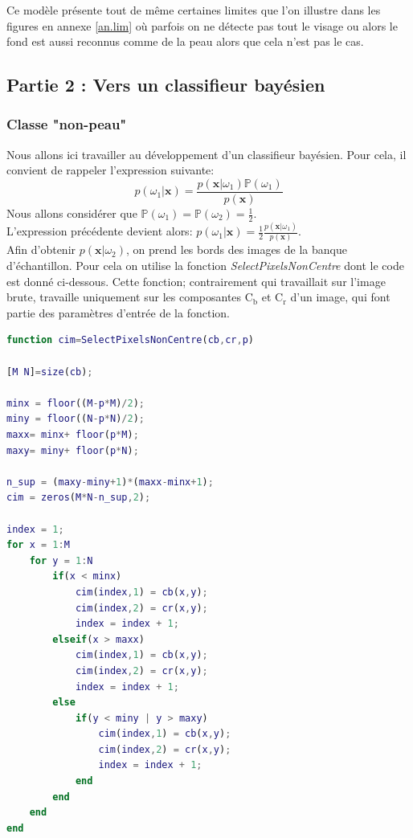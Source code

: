 \documentclass[11pt,a4paper]{article}
\begin{document}
Ce modèle présente tout de même certaines limites que l'on illustre dans les figures en annexe \ref{an.lim} où parfois on ne détecte pas tout le visage ou alors le fond est aussi reconnus comme de la peau alors que cela n'est pas le cas.

\subsection{Partie 2 : Vers un classifieur bayésien}
\subsubsection{Classe "non-peau"}
Nous allons ici travailler au développement d'un classifieur bayésien. Pour cela, il convient de rappeler l'expression suivante:
$$
p(\omega_1|\textbf{x}) = \frac{p(\textbf{x}|\omega_1)\mathbb{P}(\omega_1)}{p(\textbf{x})}
$$
Nous allons considérer que $\mathbb{P}(\omega_1) = \mathbb{P}(\omega_2) = \frac{1}{2}$.
\\
L'expression précédente devient alors: $p(\omega_1|\textbf{x})=\frac{1}{2}\frac{p(\textbf{x}|\omega_1)}{p(\textbf{x})}$.
\\
Afin d'obtenir $p(\textbf{x}|\omega_2)$, on prend les bords des images de la banque d'échantillon. Pour cela on utilise la fonction \emph{SelectPixelsNonCentre} dont le code est donné ci-dessous. Cette fonction; contrairement qui travaillait sur l'image brute, travaille uniquement sur les composantes C$_\text{b}$ et C$_\text{r}$ d'un image, qui font partie des paramètres d'entrée de la fonction.

\noindent\hrulefill
\begin{lstlisting}[language=matlab]
function cim=SelectPixelsNonCentre(cb,cr,p)

[M N]=size(cb);

minx = floor((M-p*M)/2);
miny = floor((N-p*N)/2);
maxx= minx+ floor(p*M);
maxy= miny+ floor(p*N);

n_sup = (maxy-miny+1)*(maxx-minx+1);
cim = zeros(M*N-n_sup,2);

index = 1;
for x = 1:M
    for y = 1:N
        if(x < minx)
            cim(index,1) = cb(x,y);
            cim(index,2) = cr(x,y);
            index = index + 1;
        elseif(x > maxx)
            cim(index,1) = cb(x,y);
            cim(index,2) = cr(x,y);
            index = index + 1;
        else
            if(y < miny | y > maxy)
                cim(index,1) = cb(x,y);
                cim(index,2) = cr(x,y);
                index = index + 1;
            end
        end
    end
end
\end{lstlisting}
\noindent\hrulefill
\end{document}
